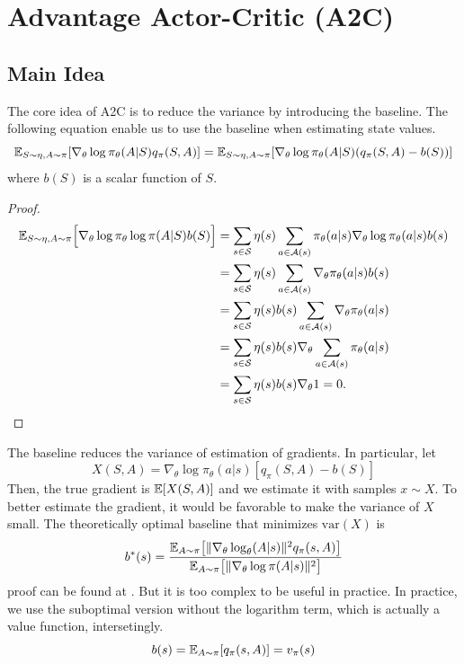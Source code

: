 \section{Advantage Actor-Critic (A2C)}
    \subsection{Main Idea}
        The core idea of A2C is to reduce the variance by introducing the baseline.
        The following equation enable us to use the baseline when estimating state values.
        \begin{equation}
            \mathbb{E}_{S \sim \eta, A \sim \pi}[\nabla_\theta \log{\pi_\theta(A|S)}q_\pi(S,A)] = \mathbb{E}_{S \sim \eta, A \sim \pi}[\nabla_\theta\log{\pi_\theta(A|S)}(q_\pi(S,A)-b(S))]
        \end{equation}
        where $b(S)$ is a scalar function of $S$.
        \begin{proof}
            \begin{align}
                \mathbb{E}_{S \sim \eta, A \sim \pi}\Big[ \nabla_\theta \log{\pi_\theta\log{\pi(A|S)}b(S)} \Big]
                    &= \sum_{s \in \mathcal{S}} \eta(s) \sum_{a \in \mathcal{A}(s)}\pi_\theta(a|s)\nabla_\theta \log{\pi_\theta(a|s)}b(s) \\
                    &= \sum_{s \in \mathcal{S}} \eta(s) \sum_{a \in \mathcal{A}(s)}\nabla_\theta \pi_\theta(a|s) b(s) \\
                    &= \sum_{s \in \mathcal{S}} \eta(s)b(s) \sum_{a \in \mathcal{A}(s)} \nabla_\theta \pi_\theta(a|s) \\
                    &= \sum_{s \in \mathcal{S}} \eta(s)b(s) \nabla_\theta \sum_{a \in \mathcal{A}(s)}\pi_\theta(a|s) \\
                    &= \sum_{s \in \mathcal{S}} \eta(s)b(s) \nabla_\theta 1 = 0.
            \end{align}
        \end{proof}

        The baseline reduces the variance of estimation of gradients. In particular, let
        \begin{equation}
            X(S,A) = \nabla_\theta \log{\pi_\theta(a|s)}[q_\pi(S,A)-b(S)]
        \end{equation}
        Then, the true gradient is $\mathbb{E}[X(S,A)]$ and we estimate it with samples $x \sim X$. To better estimate the gradient,
        it would be favorable to make the variance of $X$ small. The theoretically optimal baseline that minimizes $\text{var}(X)$ is
        \begin{equation}
            b^*(s) = \frac{\mathbb{E}_{A \sim \pi}\big[ \|\nabla_\theta \log_\theta(A|s)\|^2 q_\pi(s,A) \big]}
            {\mathbb{E}_{A \sim \pi}\big[ \|\nabla_\theta\log{\pi(A|s)}\|^2 \big]}
        \end{equation}
        proof can be found at \cite{Zhao2025}.
        But it is too complex to be useful in practice. In practice, we use the suboptimal version without the logarithm term, which is actually a value function, intersetingly.
        \begin{equation}
            b(s) = \mathbb{E}_{A \sim \pi}[q_\pi(s,A)] = v_\pi(s)
        \end{equation}

